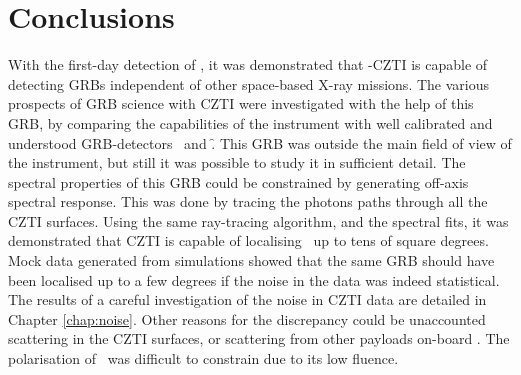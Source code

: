 \section{Conclusions}
\label{sec:conlusions--localisation}
With the first-day detection of \grb, it was demonstrated that \AS -CZTI is capable of detecting GRBs independent of other space-based X-ray missions. The various prospects of GRB science with CZTI were investigated with the help of this GRB, by comparing the capabilities of the instrument with well calibrated and understood GRB-detectors \s\ and \f. This GRB was outside the main field of view of the instrument, but still it was possible to study it in sufficient detail. The spectral properties of this GRB could be constrained by generating off-axis spectral response. This was done by tracing the photons paths through all the CZTI surfaces. Using the same ray-tracing algorithm, and the spectral fits, it was demonstrated that CZTI is capable of localising \grb\ up to tens of square degrees. Mock data generated from simulations showed that the same GRB should have been localised up to a few degrees if the noise in the data was indeed statistical. The results of a careful investigation of the noise in CZTI data are detailed in Chapter \ref{chap:noise}. Other reasons for the discrepancy could be unaccounted scattering in the CZTI surfaces, or scattering from other payloads on-board \AS. The polarisation of \grb\ was difficult to constrain due to its low fluence.